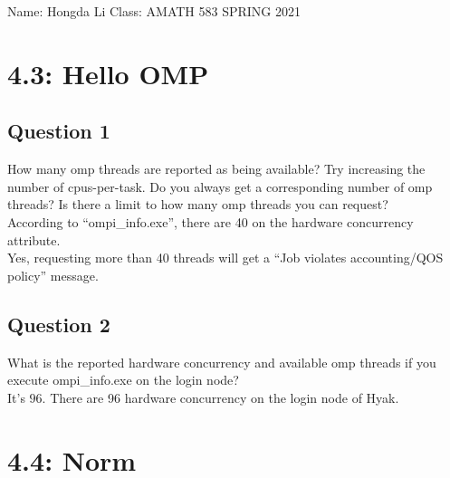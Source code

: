 \documentclass[]{article}
\begin{document}
\begin{center}
    Name: Hongda Li \quad Class: AMATH 583 \quad SPRING 2021 
\end{center}
\section*{4.3: Hello OMP}
    \subsection*{Question 1}
        How many omp threads are reported as being available? Try increasing the number of cpus-per-task. Do you always get a corresponding number of omp threads? Is there a limit to how many omp threads you can request?
        \\[1.1em]
        According to ``ompi\_info.exe'', there are 40 on the hardware concurrency attribute. 
        \\
        Yes, requesting more than 40 threads will get a ``Job violates accounting/QOS policy'' message. 
    \subsection*{Question 2}
        What is the reported hardware concurrency and available omp threads if you execute ompi\_info.exe on the login node?
        \\[1.1em]
        It's $96$. There are 96 hardware concurrency on the login node of Hyak. 
\section*{4.4: Norm}
\end{document}

